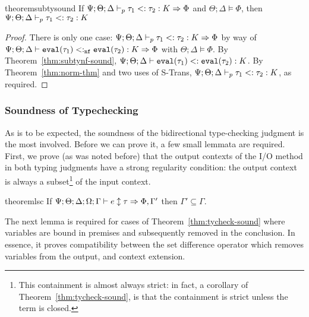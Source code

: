 \begin{restatable}{theorem}{subtysound}
If $\Psi ; \Theta ; \Delta \vdash_p \tau_1 <:\tau_2 : K \Rightarrow \Phi$ and $\Theta ; \Delta \vDash \Phi$, then $\Psi ; \Theta ; \Delta \vdash_p \tau_1 <: \tau_2 : K$
\label{thm:subty-sound}
\end{restatable}
\begin{proof}
There is only one case: $\Psi ; \Theta ; \Delta \vdash_p \tau_1 <:\tau_2 : K \Rightarrow \Phi$ by way of $\Psi ; \Theta ; \Delta \vdash \texttt{eval}(\tau_1) <:_{\texttt{nf}} \texttt{eval}(\tau_2) : K \Rightarrow \Phi$ with $\Theta ; \Delta \vDash \Phi$. By Theorem~\ref{thm:subtynf-sound}, $\Psi ; \Theta ; \Delta \vdash \texttt{eval}(\tau_1) <: \texttt{eval}(\tau_2) : K$. By Theorem~\ref{thm:norm-thm} and two uses of S-Trans, $\Psi ; \Theta ; \Delta \vdash_p \tau_1 <: \tau_2 : K$, as required.
\end{proof}

\subsubsection{Soundness of Typechecking}

As is to be expected, the soundness of the bidirectional type-checking judgment is the most involved. Before we can prove it, a few small lemmata are required.
First, we prove (as was noted before) that the output contexts of the I/O method in both typing judgments have a strong regularity condition: the output context is always a subset\footnote{
This containment is almost always strict: in fact, a corollary of Theorem~\ref{thm:tycheck-sound}, is that the containment is strict unless the term is closed.
}
of the input context.

\begin{restatable}{theorem}{lsc}
If $\Psi ; \Theta ; \Delta ; \Omega ; \Gamma \vdash e \updownarrow \tau \Rightarrow \Phi, \Gamma'$ then $\Gamma' \subseteq \Gamma$.
\label{thm:lsc}
\end{restatable}

The next lemma is required for cases of Theorem~\ref{thm:tycheck-sound} where variables are bound in premises and subsequently removed in the conclusion. In essence, it proves compatibility between the set difference operator which removes variables from the output, and context extension.

